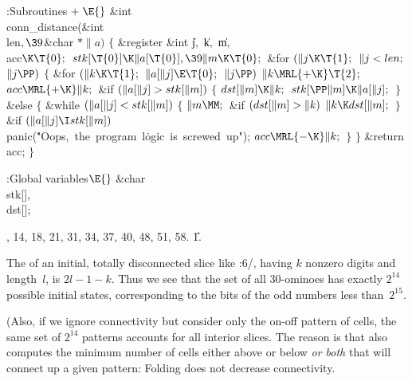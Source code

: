 \Y\B\4:Subroutines\X${}\mathrel+\E{}$\6
\&{int} \\{conn\_distance}(\&{int} \\{len}${},\39{}$\&{char} ${}{*}\|a){}$\1\1%
\2\2\6
${}\{{}$\1\6
\&{register} \&{int} \|j${},{}$ \|k${},{}$ \|m${},{}$ \\{acc}${}\K\T{0};{}$\7
${}\\{stk}[\T{0}]\K\|a[\T{0}],\39\|m\K\T{0};{}$\6
\&{for} ${}(\|j\K\T{1};{}$ ${}\|j<\\{len};{}$ ${}\|j\PP){}$\5
${}\{{}$\1\6
\&{for} ${}(\|k\K\T{1};{}$ ${}\|a[\|j]\E\T{0};{}$ ${}\|j\PP){}$\1\5
${}\|k\MRL{+{\K}}\T{2};{}$\2\6
${}\\{acc}\MRL{+{\K}}\|k;{}$\6
\&{if} ${}(\|a[\|j]>\\{stk}[\|m]){}$\5
${}\{{}$\1\6
${}\\{dst}[\|m]\K\|k;{}$\6
${}\\{stk}[\PP\|m]\K\|a[\|j];{}$\6
\4${}\}{}$\5
\2\&{else}\5
${}\{{}$\1\6
\&{while} ${}(\|a[\|j]<\\{stk}[\|m]){}$\5
${}\{{}$\1\6
${}\|m\MM;{}$\6
\&{if} ${}(\\{dst}[\|m]>\|k){}$\1\5
${}\|k\K\\{dst}[\|m];{}$\2\6
\4${}\}{}$\2\6
\&{if} ${}(\|a[\|j]\I\\{stk}[\|m]){}$\1\5
\\{panic}(\.{"Oops,\ the\ program\ l}\)\.{ogic\ is\ screwed\ up"});\2\6
${}\\{acc}\MRL{-{\K}}\|k;{}$\6
\4${}\}{}$\2\6
\4${}\}{}$\2\6
\&{return} \\{acc};\6
\4${}\}{}$\2\par
\fi

\B{}:Global variables\X${}\E{}$\6
\&{char} \\{stk}[]${},{}$ \\{dst}[];\par
{}, 14, 18, 21, 31, 34, 37, 40, 48, 51, 58.
\U1.\fi

The  of an initial, totally disconnected slice like
:6/, having $k$ nonzero digits and length~$l$, is $2l-1-k$.
Thus we see that the set of all 30-ominoes has exactly $2^{14}$ possible
initial states, corresponding to the bits of the odd numbers less
than~$2^{15}$.

(Also, if we ignore connectivity but consider only the on-off pattern of
cells, the same set of $2^{14}$ patterns accounts for all interior slices.
The reason is that  also computes the minimum number of
cells either above or below {\it or both\/} that will connect up a
given pattern: Folding does not decrease connectivity.

